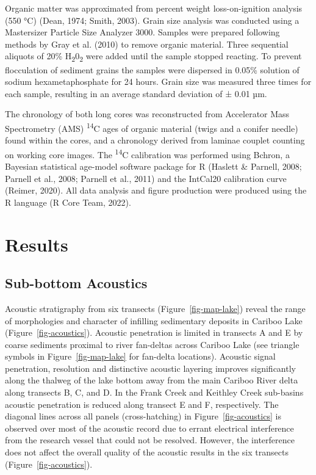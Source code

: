 \documentclass[
  letterpaper,
  DIV=11,
  numbers=noendperiod]{scrartcl}
\begin{document}
Organic matter was approximated from percent weight loss-on-ignition
analysis (550 °C) (Dean, 1974; Smith, 2003). Grain size analysis was
conducted using a Mastersizer Particle Size Analyzer 3000. Samples were
prepared following methods by Gray et al. (2010) to remove organic
material. Three sequential aliquots of 20\%
H\textsubscript{2}0\textsubscript{2} were added until the sample stopped
reacting. To prevent flocculation of sediment grains the samples were
dispersed in 0.05\% solution of sodium hexametaphosphate for 24 hours.
Grain size was measured three times for each sample, resulting in an
average standard deviation of ± 0.01 µm.

The chronology of both long cores was reconstructed from Accelerator
Mass Spectrometry (AMS) \textsuperscript{14}C ages of organic material
(twigs and a conifer needle) found within the cores, and a chronology
derived from laminae couplet counting on working core images. The
\textsuperscript{14}C calibration was performed using Bchron, a Bayesian
statistical age-model software package for R (Haslett \& Parnell, 2008;
Parnell et al., 2008; Parnell et al., 2011) and the IntCal20 calibration
curve (Reimer, 2020). All data analysis and figure production were
produced using the R language (R Core Team, 2022).

\hypertarget{results}{%
\section{Results}\label{results}}

\hypertarget{sub-bottom-acoustics}{%
\subsection{Sub-bottom Acoustics}\label{sub-bottom-acoustics}}

Acoustic stratigraphy from six transects (Figure~\ref{fig-map-lake})
reveal the range of morphologies and character of infilling sedimentary
deposits in Cariboo Lake (Figure~\ref{fig-acoustics}). Acoustic
penetration is limited in transects A and E by coarse sediments proximal
to river fan-deltas across Cariboo Lake (see triangle symbols in
Figure~\ref{fig-map-lake} for fan-delta locations). Acoustic signal
penetration, resolution and distinctive acoustic layering improves
significantly along the thalweg of the lake bottom away from the main
Cariboo River delta along transects B, C, and D. In the Frank Creek and
Keithley Creek sub-basins acoustic penetration is reduced along transect
E and F, respectively. The diagonal lines across all panels
(cross-hatching) in Figure~\ref{fig-acoustics} is observed over most of
the acoustic record due to errant electrical interference from the
research vessel that could not be resolved. However, the interference
does not affect the overall quality of the acoustic results in the six
transects (Figure~\ref{fig-acoustics}).
\end{document}
